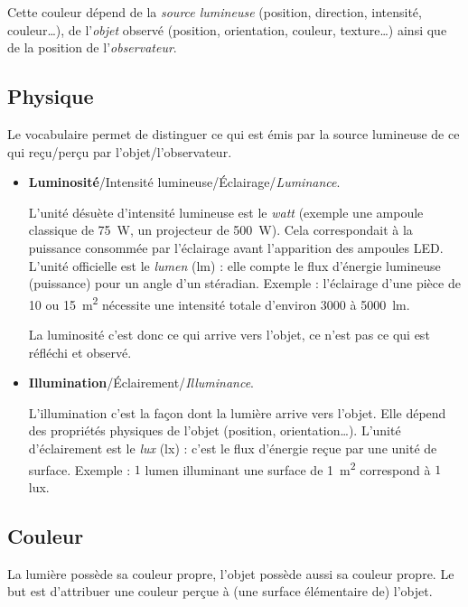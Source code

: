 \documentclass[11pt,class=report,crop=false]{standalone}
\begin{document}
Cette couleur dépend de la \emph{source lumineuse} (position, direction, intensité, couleur\ldots), de l'\emph{objet} observé (position, orientation, couleur, texture\ldots) ainsi que de la position de l'\emph{observateur}.

\subsection{Physique}

Le vocabulaire permet de distinguer ce qui est émis par la source lumineuse de ce qui reçu/perçu par l'objet/l'observateur.

\begin{itemize}
  \item \textbf{Luminosité}/Intensité lumineuse/Éclairage/\emph{Luminance}.

  L'unité désuète d'intensité lumineuse est le \emph{watt} (exemple une ampoule classique de \SI{75}{\watt}, un projecteur de \SI{500}{\watt}). Cela correspondait à la puissance consommée par l'éclairage avant l'apparition des ampoules LED. L'unité officielle est le \emph{lumen} (lm) : elle compte le flux d'énergie lumineuse (puissance) pour un angle d'un stéradian.
  Exemple : l'éclairage d'une pièce de 10 ou \SI{15}{\meter^2} nécessite une intensité totale d'environ 3000 à \SI{5000}{\lumen}.  

  La luminosité c'est donc ce qui arrive vers l'objet, ce n'est pas ce qui est réfléchi et observé.

  \item\textbf{Illumination}/Éclairement/\emph{Illuminance}.

  L'illumination c'est la façon dont la lumière arrive vers l'objet. Elle dépend des propriétés physiques de l'objet (position, orientation\ldots).
  L'unité d'éclairement est le \emph{lux} (lx) : c'est le flux d'énergie reçue par une unité de surface. Exemple : $1$ lumen illuminant une surface de \SI{1}{\meter^2} correspond à $1$ lux. 
\end{itemize}


\subsection{Couleur}


La lumière possède sa couleur propre, l'objet possède aussi sa couleur propre. Le but est d'attribuer une couleur perçue à (une surface élémentaire de) l'objet.
\end{document}
